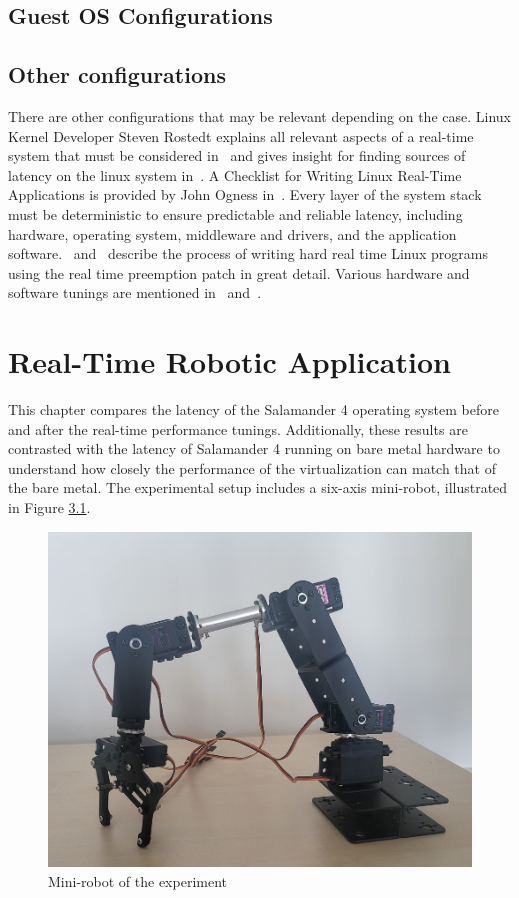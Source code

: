 \documentclass[MMR,Master,english]{twbook}
\begin{document}
\section{Guest OS Configurations}







\section{Other configurations}
There are other configurations that may be relevant depending on the case. Linux Kernel Developer Steven Rostedt explains all relevant aspects of a real-time system that must be considered in~\cite{kernelrecipesKernelRecipes20162016} and gives insight for finding sources of latency on the linux system in~\cite{thelinuxfoundationFindingSourcesLatency2020}. A Checklist for Writing Linux Real-Time Applications is provided by John Ogness in~\cite{thelinuxfoundationChecklistWritingLinux2020}. Every layer of the system stack must be deterministic to ensure predictable and reliable latency, including hardware, operating system, middleware and drivers, and the application software.~\cite{HOWTOBuildRTapplication} and~\cite{RealtimeProgrammingLinux} describe the process of writing hard real time Linux programs using the real time preemption patch in great detail. Various hardware and software tunings are mentioned in~\cite{KVMQemuVirtualization} and~\cite{RealTimePerformanceTuning2022}.

\clearpage

\chapter{Real-Time Robotic Application}\label{cha:real-time-testing}
This chapter compares the latency of the Salamander 4 operating system before and after the real-time performance tunings. Additionally, these results are contrasted with the latency of Salamander 4 running on bare metal hardware to understand how closely the performance of the virtualization can match that of the bare metal. The experimental setup includes a six-axis mini-robot, illustrated in Figure \ref{fig:mini_robot}. 

\begin{figure}[H]
	\centering
	\includegraphics[width=0.45\columnwidth]{img/experiment/mini_robot.jpg}
	\caption[Mini-robot of the experiment]{Mini-robot of the experiment}
	\label{fig:mini_robot}
\end{figure}
\end{document}
